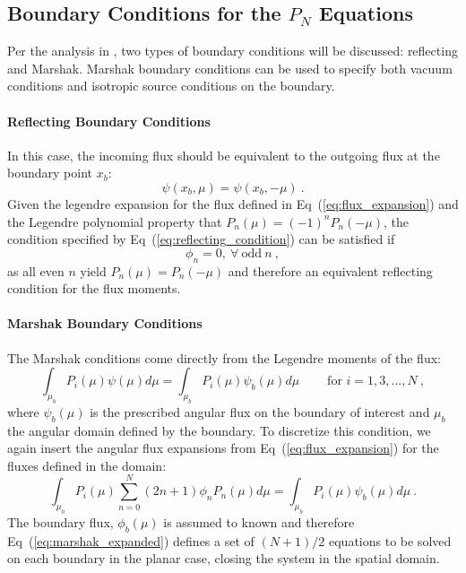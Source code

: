 \subsection{Boundary Conditions for the $P_N$ Equations}
\label{subsbusec:bcs_pn}
Per the analysis in \citep{lewis_computational_1993}, two types of
boundary conditions will be discussed: reflecting and Marshak. Marshak
boundary conditions can be used to specify both vacuum conditions and
isotropic source conditions on the boundary.

\paragraph{Reflecting Boundary Conditions}
In this case, the incoming flux should be equivalent to the outgoing
flux at the boundary point $x_b$:
\begin{equation}
  \psi(x_b,\mu) = \psi(x_b,-\mu)\:.
  \label{eq:reflecting_condition}
\end{equation}
Given the legendre expansion for the flux defined in
Eq~(\ref{eq:flux_expansion}) and the Legendre polynomial property that
$P_n(\mu) = (-1)^n P_n(-\mu)$, the condition specified by
Eq~(\ref{eq:reflecting_condition}) can be satisfied if
\begin{equation}
  \phi_n = 0,\ \forall \ \text{odd}\ n\:,
  \label{eq:reflecting_condition_odd}
\end{equation}
as all even $n$ yield $P_n(\mu) = P_n(-\mu)$ and therefore an
equivalent reflecting condition for the flux moments.

\paragraph{Marshak Boundary Conditions}
The Marshak conditions come directly from the Legendre moments of the
flux:
\begin{equation}
  \int_{\mu_b} P_i(\mu) \psi(\mu) d\mu = \int_{\mu_b} P_i(\mu)
  \psi_b(\mu) d\mu\ \ \ \ \ \ \ \ \ \ \text{for $i=1,3,...,N$}\:,
  \label{eq:general_marshak}
\end{equation}
where $\psi_b(\mu)$ is the prescribed angular flux on the boundary of
interest and $\mu_b$ the angular domain defined by the boundary. To
discretize this condition, we again insert the angular flux expansions
from Eq~(\ref{eq:flux_expansion}) for the fluxes defined in the
domain:
\begin{equation}
  \int_{\mu_b} P_i(\mu) \sum_{n=0}^N (2n+1) \phi_n P_n(\mu) d\mu =
  \int_{\mu_b} P_i(\mu) \psi_b(\mu) d\mu\:.
  \label{eq:marshak_expanded}
\end{equation}
The boundary flux, $\phi_b(\mu)$ is assumed to known and therefore
Eq~(\ref{eq:marshak_expanded}) defines a set of $(N+1)/2$ equations to
be solved on each boundary in the planar case, closing the system in
the spatial domain.

